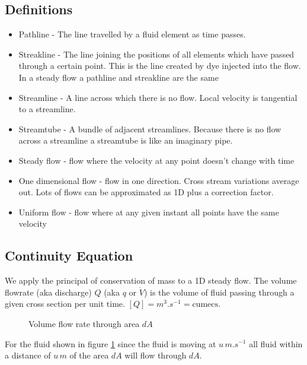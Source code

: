\documentclass{article}
\begin{document}
    \subsection{Definitions}
    \begin{itemize}
        \item Pathline - The line travelled by a fluid element as time passes.
        \item Streakline - The line joining the positions of all elements which have passed through a certain point. 
        This is the line created by dye injected into the flow.
        In a steady flow a pathline and streakline are the same
        \item Streamline - A line across which there is no flow.
        Local velocity is tangential to a streamline.
        \item Streamtube - A bundle of adjacent streamlines.
        Because there is no flow across a streamline a streamtube is like an imaginary pipe.
        \item Steady flow - flow where the velocity at any point doesn't change with time
        \item One dimensional flow - flow in one direction.
        Cross stream variations average out.
        Lots of flows can be approximated as 1D plus a correction factor.
        \item Uniform flow - flow where at any given instant all points have the same velocity
    \end{itemize}
    
    \subsection{Continuity Equation}
    We apply the principal of conservation of mass to a 1D steady flow.
    The volume flowrate (aka discharge) \(Q\) (aka \(q\) or \(\dot V\)) is the volume of fluid passing through a given cross section per unit time.
    \([Q] = \si{m^3.s^{-1}} = \text{cumecs}\).
    
    \begin{figure}[ht]
        \centering
        \caption{Volume flow rate through area \(dA\)}
        \label{fig:volume flow rate through area dA}
    \end{figure}
    For the fluid shown in figure \ref{fig:volume flow rate through area dA} since the fluid is moving at \(u\,\si{m.s^{-1}}\) all fluid within a distance of \(u\,\si{m}\) of the area \(dA\) will flow through \(dA\).
    
\end{document}
